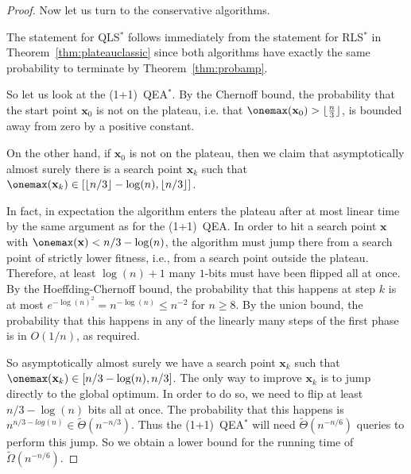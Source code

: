 \begin{proof}
Now let us turn to the conservative algorithms.

The statement for QLS$^*$ follows immediately from the statement for RLS$^*$ in Theorem~\ref{thm:plateauclassic} since both algorithms have exactly the same probability to terminate by Theorem~\ref{thm:probamp}.

So let us look at the (1+1)~QEA$^*$. By the Chernoff bound, the probability that the start point $\mathbf{x}_0$ is not on the plateau, i.e. that $\onemax(\mathbf{x}_0) > \lfloor \frac{n}{3} \rfloor$, is bounded away from zero by a positive constant.

On the other hand, if $\mathbf{x}_0$ is not on the plateau, then we claim that asymptotically almost surely there is a search point $\mathbf{x}_k$ such that $\onemax(\mathbf{x}_k) \in [\lfloor n/3 \rfloor - \log(n), \lfloor n/3 \rfloor]$.

In fact, in expectation the algorithm enters the plateau after at most linear time by the same argument as for the (1+1)~QEA. In order to hit a search point $\mathbf{x}$ with $\onemax(\mathbf{x}) < n/3 - \log(n)$, the algorithm must jump there from a search point of strictly lower fitness, i.e., from a search point outside the plateau. Therefore, at least $\log(n)+1$ many $1$-bits must have been flipped all at once. By the Hoeffding-Chernoff bound, the probability that this happens at step $k$ is at most $e^{-\log(n)^2} = n^{-\log(n)} \leq n^{-2}$ for $n \ge 8$. By the union bound, the probability that this happens in any of the linearly many steps of the first phase is in $O(1/n)$, as required.


So asymptotically almost surely we have a search point $\mathbf{x}_k$ such that $\onemax(\mathbf{x}_k) \in [n/3 - \log(n), n/3]$. The only way to improve $\mathbf{x}_k$ is to jump directly to the global optimum. In order to do so, we need to flip at least $n/3 - \log(n)$ bits all at once. The probability that this happens is $n^{n/3 - log(n)} \in \tilde{\Theta}(n^{-n/3})$. Thus the (1+1)~QEA$^*$ will need $\tilde{\Theta}(n^{-n/6})$ queries to perform this jump. So we obtain a lower bound for the running time of $\tilde{\Omega}(n^{-n/6})$.


\end{proof}
